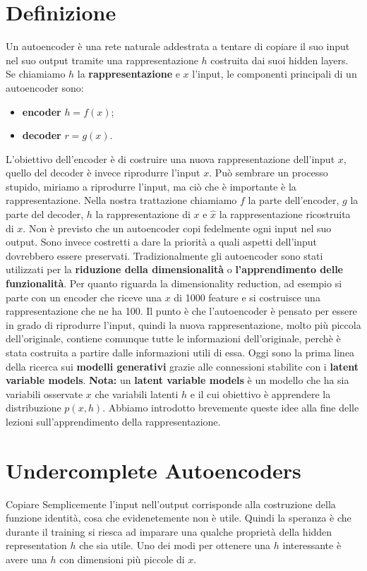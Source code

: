 \section{Definizione}
Un autoencoder è una rete naturale addestrata a tentare di copiare il suo input nel suo output tramite una 
rappresentazione $h$ costruita dai suoi hidden layers. Se chiamiamo $h$ la \textbf{rappresentazione} e $x$ 
l'input, le componenti principali di un autoencoder sono:
\begin{itemize}
  \item \textbf{encoder} $h=f(x)$;
  \item \textbf{decoder} $r=g(x)$.
\end{itemize}
L'obiettivo dell'encoder è di costruire una nuova rappresentazione dell'input $x$, quello del decoder è invece
riprodurre l'input $x$. Può sembrare un processo stupido, miriamo a riprodurre l'input, ma ciò che è
importante è la rappresentazione. Nella nostra trattazione chiamiamo $f$ la parte dell'encoder, $g$ la parte
del decoder, $h$ la rappresentazione di $x$ e $\hat{x}$ la rappresentazione ricostruita di $x$.
Non è previsto che un autoencoder copi fedelmente ogni input nel suo output. Sono invece costretti a dare 
la priorità a quali aspetti dell'input dovrebbero essere preservati.
\newline
\newline
Tradizionalmente gli autoencoder sono stati utilizzati per la \textbf{riduzione della dimensionalità} o 
\textbf{l'apprendimento delle funzionalità}. Per quanto riguarda la dimensionality reduction, ad esempio 
si parte con un encoder che riceve una $x$ di 1000 feature e si costruisce una rappresentazione che ne ha 
100. Il punto è che l'autoencoder è pensato per essere in grado di riprodurre l'input, quindi la nuova 
rappresentazione, molto più piccola dell'originale, contiene comunque tutte le informazioni dell'originale,
perchè è stata costruita a partire dalle informazioni utili di essa.
\newline
Oggi sono la prima linea della ricerca sui \textbf{modelli generativi} grazie alle connessioni stabilite 
con i \textbf{latent variable models}.
\newline
\textbf{Nota:} un \textbf{latent variable models} è un modello che ha sia variabili osservate $x$ che 
variabili latenti $h$ e il cui obiettivo è apprendere la distribuzione $p(x, h)$. Abbiamo introdotto 
brevemente queste idee alla fine delle lezioni sull'apprendimento della rappresentazione.
\newpage

\section{Undercomplete Autoencoders}
Copiare Semplicemente l'input nell'output corrisponde alla costruzione della funzione identità, cosa che 
evidenetemente non è utile. Quindi la speranza è che durante il training si riesca ad imparare una qualche 
proprietà della hidden representation $h$ che sia utile.
\newline
Uno dei modi per ottenere una $h$ interessante è avere una $h$ con dimensioni più piccole di $x$. 

